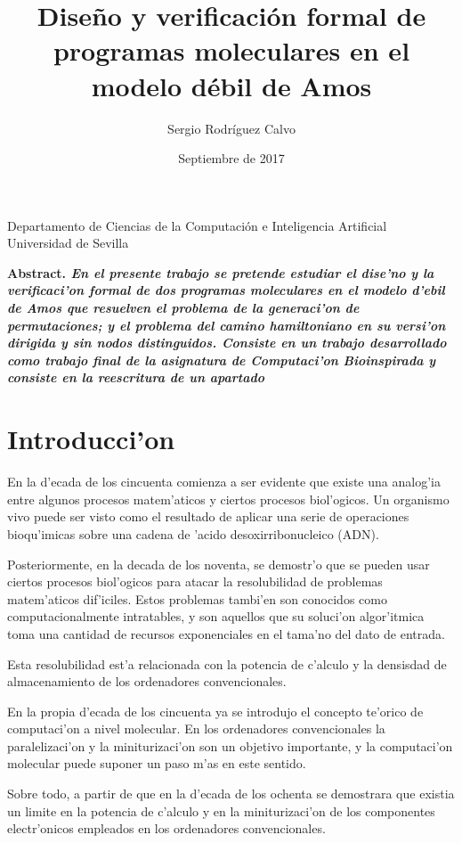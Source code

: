 \documentclass[12pt]{article}
\title{Dise\~no y verificaci\'on formal de programas moleculares en el modelo d\'ebil de Amos}
\author{Sergio Rodr\'iguez Calvo}
\date{Septiembre de 2017}
\begin{document}
    \maketitle
    \thispagestyle{empty}
    \begin{center}
      Departamento de Ciencias de la Computaci\'on e
      Inteligencia Artificial \\
      Universidad de Sevilla
      \end{center}
  \bf{Abstract. }\rm
    \emph{En el presente trabajo se pretende estudiar el dise'no y la verificaci'on formal
    de dos programas moleculares en el modelo d'ebil de Amos que resuelven el problema de la generaci'on
    de permutaciones; y el problema del camino hamiltoniano en su versi'on dirigida y sin
    nodos distinguidos. Consiste en un trabajo desarrollado como trabajo final de la asignatura de
    Computaci'on Bioinspirada y consiste en la reescritura de un apartado }

\section{Introducci'on}

En la d'ecada de los cincuenta comienza a ser evidente que existe una analog'ia entre algunos procesos
matem'aticos y ciertos procesos biol'ogicos. Un organismo vivo puede ser visto como el resultado de
aplicar una serie de operaciones bioqu'imicas sobre una cadena de 'acido desoxirribonucleico (ADN).

Posteriormente, en la decada de los noventa, se demostr'o que se pueden usar ciertos procesos biol'ogicos
para atacar la resolubilidad de problemas matem'aticos dif'iciles. Estos problemas tambi'en son conocidos
como computacionalmente intratables, y son aquellos que su soluci'on algor'itmica toma una cantidad de
recursos exponenciales en el tama'no del dato de entrada.

Esta resolubilidad est'a relacionada con la potencia de c'alculo y la densisdad de almacenamiento de los
ordenadores convencionales.

En la propia d'ecada de los cincuenta ya se introdujo el concepto te'orico de computaci'on a nivel molecular.
En los ordenadores convencionales la paralelizaci'on y la miniturizaci'on son un objetivo importante, y la
computaci'on molecular puede suponer un paso m'as en este sentido.

Sobre todo, a partir de que en la d'ecada de los ochenta se demostrara que existia un limite en la potencia
de c'alculo y en la miniturizaci'on de los componentes electr'onicos empleados en los ordenadores convencionales.
\end{document}
